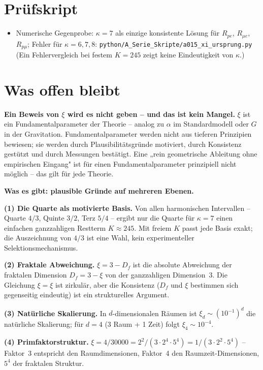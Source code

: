 \section{Prüfskript}

\begin{itemize}[leftmargin=2em,itemsep=2pt,topsep=2pt]
  \item Numerische Gegenprobe: $\kappa=7$ als einzige konsistente Lösung für
    $R_{pe}$, $R_{\mu e}$, $R_{p\mu}$; Fehler für $\kappa=6,7,8$:
    \texttt{python/A\_Serie\_Skripte/a015\_xi\_ursprung.py}
    (Ein Fehlervergleich bei festem $K=245$ zeigt keine Eindeutigkeit von $\kappa$.)
\end{itemize}

\section{Was offen bleibt}

\textbf{Ein Beweis von $\xi$ wird es nicht geben -- und das ist kein Mangel.}
$\xi$ ist ein Fundamentalparameter der Theorie -- analog zu $\alpha$ im
Standardmodell oder $G$ in der Gravitation. Fundamentalparameter werden nicht
aus tieferen Prinzipien bewiesen; sie werden durch Plausibilitätsgründe
motiviert, durch Konsistenz gestützt und durch Messungen bestätigt. Eine
„rein geometrische Ableitung ohne empirischen Eingang" ist für einen
Fundamentalparameter prinzipiell nicht möglich -- das gilt für jede Theorie.

\textbf{Was es gibt: plausible Gründe auf mehreren Ebenen.}

\textbf{(1) Die Quarte als motivierte Basis.} Von allen harmonischen
Intervallen -- Quarte $4/3$, Quinte $3/2$, Terz $5/4$ -- ergibt nur die
Quarte für $\kappa=7$ einen einfachen ganzzahligen Restterm $K \approx 245$.
Mit freiem $K$ passt jede Basis exakt; die Auszeichnung von $4/3$ ist eine Wahl,
kein experimenteller Selektionsmechanismus.

\textbf{(2) Fraktale Abweichung.} $\xi=3-D_f$ ist die absolute Abweichung
der fraktalen Dimension $D_f=3-\xi$ von der ganzzahligen Dimension~3.
Die Gleichung $\xi=\xi$ ist zirkulär, aber die Konsistenz ($D_f$ und $\xi$
bestimmen sich gegenseitig eindeutig) ist ein strukturelles Argument.

\textbf{(3) Natürliche Skalierung.} In $d$-dimensionalen Räumen ist $\xi_d
\sim(10^{-1})^d$ die natürliche Skalierung; für $d=4$ (3 Raum + 1 Zeit)
folgt $\xi_4\sim10^{-4}$.

\textbf{(4) Primfaktorstruktur.} $\xi=4/30000=2^2/(3\cdot2^4\cdot5^4)
=1/(3\cdot2^2\cdot5^4)$ -- Faktor~3 entspricht den Raumdimensionen,
Faktor~4 den Raumzeit-Dimensionen, $5^4$ der fraktalen Struktur.

